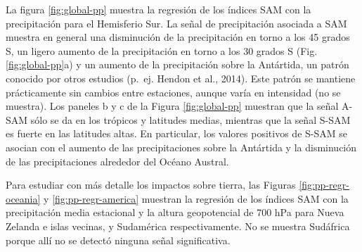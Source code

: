 \documentclass[12pt,oneside]{reedthesis}
\begin{document}
La figura \ref{fig:global-pp} muestra la regresión de los índices SAM con la precipitación para el Hemisferio Sur. La señal de precipitación asociada a SAM muestra en general una disminución de la precipitación en torno a los 45 grados S, un ligero aumento de la precipitación en torno a los 30 grados S (Fig. \ref{fig:global-pp}a) y un aumento de la precipitación sobre la Antártida, un patrón conocido por otros estudios (p.~ej. Hendon et al., 2014).
Este patrón se mantiene prácticamente sin cambios entre estaciones, aunque varía en intensidad (no se muestra).
Los paneles b y c de la Figura \ref{fig:global-pp} muestran que la señal A-SAM sólo se da en los trópicos y latitudes medias, mientras que la señal S-SAM es fuerte en las latitudes altas.
En particular, los valores positivos de S-SAM se asocian con el aumento de las precipitaciones sobre la Antártida y la disminución de las precipitaciones alrededor del Océano Austral.

Para estudiar con más detalle los impactos sobre tierra, las Figuras \ref{fig:pp-regr-oceania} y \ref{fig:pp-regr-america} muestran la regresión de los índices SAM con la precipitación media estacional y la altura geopotencial de 700 hPa para Nueva Zelanda e islas vecinas, y Sudamérica respectivamente.
No se muestra Sudáfrica porque allí no se detectó ninguna señal significativa.
\end{document}
